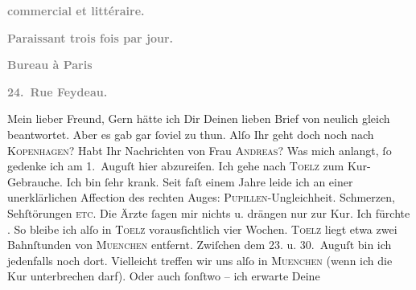 \begin{ledgroupsized}[t]{13cm}
           \pstart
           \begin{otherlanguage}{french}\textcolor{gray}{\textbf{commercial et littéraire.}}\end{otherlanguage}\pend
           \pstart
           \begin{otherlanguage}{french}\textcolor{gray}{\textbf{\textbf{Paraissant trois fois par jour.}}}\end{otherlanguage}\pend
           \pstart
           \begin{otherlanguage}{french}\textcolor{gray}{\textbf{\textbf{Bureau à Paris}}}\end{otherlanguage}\pend
           \pstart
           \begin{otherlanguage}{french}\textcolor{gray}{\textbf{\textbf{24. Rue Feydeau.}}}\end{otherlanguage}\pend
           \pstart\center{}Mein lieber Freund,\pend\pstart
           Gern hätte ich Dir Deinen lieben Brief von neulich gleich beantwortet. Aber es gab
               gar ſoviel zu thun.\pend
           \pstart
           Alſo Ihr geht doch noch nach \textsc{Kopenhagen}? Habt Ihr Nachrichten von Frau \textsc{Andreas}?\pend
           \pstart
           Was mich anlangt, ſo gedenke ich am 1. Auguſt hier
               abzureiſen. Ich gehe nach \textsc{Toelz} zum Kur-Gebrauche. Ich bin ſehr krank. Seit faſt einem Jahre leide ich an einer
               unerklärlichen Affection des rechten Auges: \textsc{Pupillen}-Ungleichheit. Schmerzen, {\pb}Sehſtörungen \textsc{etc}. Die  Ärzte ſagen mir nichts u. drängen nur zur Kur.
               Ich fürchte \label{K_L02741-1v}\label{K_L02741-1h}.\pend
           \pstart
           So bleibe ich alſo in \textsc{Toelz} vorausſichtlich vier Wochen. \textsc{Toelz} liegt etwa zwei Bahnſtunden von \textsc{Muenchen} entfernt. Zwiſchen dem 23. u. 30. Auguſt bin ich jedenfalls noch dort. Vielleicht
               treffen wir uns alſo in \textsc{Muenchen} (wenn ich die Kur unterbrechen darf). Oder auch ſonſtwo – ich erwarte Deine

\end{ledgroupsized}
